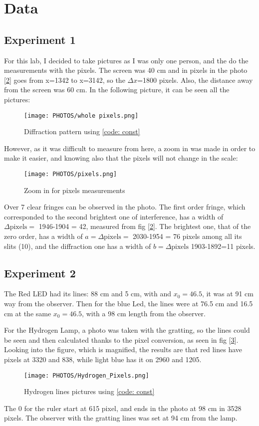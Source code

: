 \section{Data}
\subsection{Experiment 1}

For this lab, I decided to take pictures as I was only one person, and the do the measurements with the pixels. The screen was 40 cm and in pixels in the photo [\ref{fig: zoom}] goes from x=1342 to x=3142, so the $\Delta x$=1800 pixels. Also, the distance away from the screen was 60 cm. In the following picture, it can be seen all the pictures:
\begin{figure}[H]
    \centering
    \texttt{[image: PHOTOS/whole pixels.png]}
    \caption{Diffraction pattern using \ref{code: const}}
    \label{fig: diffpat}
\end{figure}
However, as it was difficult to measure from here, a zoom in was made in order to make it easier, and knowing also that the pixels will not change in the scale:
\begin{figure}[H]
    \centering
    \texttt{[image: PHOTOS/pixels.png]}
    \caption{Zoom in for pixels measurements}
    \label{fig: zoom}
\end{figure}
Over 7 clear fringes can be observed in the photo. The first order fringe, which corresponded to the second brightest one of  interference, has a width of $\Delta\text{pixels}=$ 1946-1904 = 42, measured from fig [\ref{fig: zoom}]. The brightest one, that of the zero order, has a width of $a=\Delta\text{pixels}=$ 2030-1954 = 76 pixels among all its slits (10), and the diffraction one has a width of $b=\Delta \text{pixels}$ 1903-1892=11 pixels. 


\subsection{Experiment 2}
The Red LED had its lines: 88 cm and 5 cm, with and $x_0=46.5$, it was at 91 cm way from the observer. Then for the blue Led, the lines were at 76.5 cm and 16.5 cm at the same $x_0=46.5$, with a 98 cm length from the observer. 

For the Hydrogen Lamp, a photo was taken with the gratting, so the lines could be seen and then calculated thanks to the pixel conversion,  as seen in fig [\ref{fig: hydrogen}]. Looking into the figure, which is magnified, the results are that red lines have pixels at 3320 and 838, while light blue has it on 2960 and 1205. 
\begin{figure}[H]
    \centering
    \texttt{[image: PHOTOS/Hydrogen\_Pixels.png]}
    \caption{Hydrogen lines pictures using \ref{code: const}}
    \label{fig: hydrogen}
\end{figure}
The 0 for the ruler start at 615 pixel, and ends in the photo at 98 cm in 3528 pixels. The observer with the gratting lines was set at 94 cm from the lamp.

